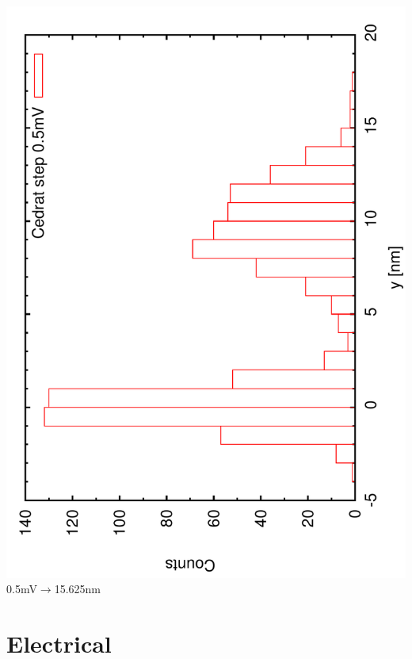 \documentclass[a4paper,11pt]{book}
\begin{document}
\includegraphics[angle=-90,scale=0.15]{imagestep12a.pdf}\\
{\scriptsize 0.5mV$\rightarrow$15.625nm}\\

\section{Electrical}
\end{document}
